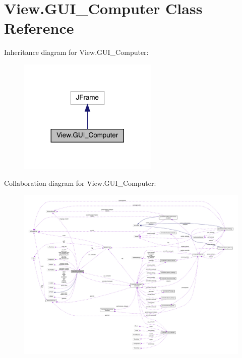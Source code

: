 \hypertarget{class_view_1_1_g_u_i___computer}{}\section{View.\+G\+U\+I\+\_\+\+Computer Class Reference}
\label{class_view_1_1_g_u_i___computer}


Inheritance diagram for View.\+G\+U\+I\+\_\+\+Computer\+:
\nopagebreak
\begin{figure}[H]
\begin{center}
\leavevmode
\includegraphics[width=188pt]{class_view_1_1_g_u_i___computer__inherit__graph}
\end{center}
\end{figure}


Collaboration diagram for View.\+G\+U\+I\+\_\+\+Computer\+:
\nopagebreak
\begin{figure}[H]
\begin{center}
\leavevmode
\includegraphics[width=350pt]{class_view_1_1_g_u_i___computer__coll__graph}
\end{center}
\end{figure}
